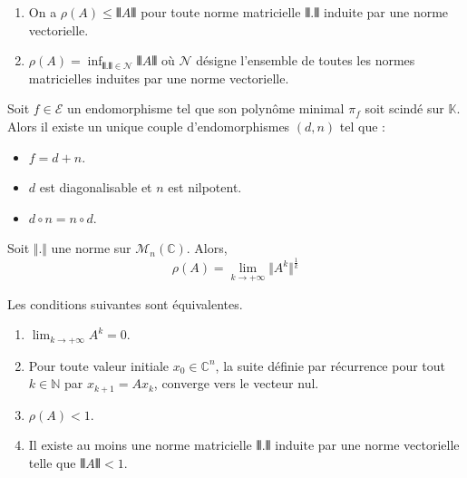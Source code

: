   \begin{theorem}
    \begin{enumerate}[label=(\roman*)]
      \item On a $\rho(A) \leq \VERT A \VERT$ pour toute norme matricielle $\VERT . \VERT$ induite par une norme vectorielle.
      \item $\rho(A) = \inf_{\VERT . \VERT \in \mathcal{N}} \VERT A \VERT$ où $\mathcal{N}$ désigne l'ensemble de toutes les normes matricielles induites par une norme vectorielle.
    \end{enumerate}
  \end{theorem}


  \begin{theorem}
    Soit $f \in \mathcal{E}$ un endomorphisme tel que son polynôme minimal $\pi_f$ soit scindé sur $\mathbb{K}$. Alors il existe un unique couple d'endomorphismes $(d, n)$ tel que :
    \begin{itemize}
      \item $f = d + n$.
      \item $d$ est diagonalisable et $n$ est nilpotent.
      \item $d \circ n = n \circ d$.
    \end{itemize}
  \end{theorem}


  \begin{corollary}
    Soit $\Vert . \Vert$ une norme sur $\mathcal{M}_n(\mathbb{C})$. Alors,
    \[ \rho(A) = \lim_{k \rightarrow +\infty} \Vert A^k \Vert^{\frac{1}{k}} \]
  \end{corollary}

  \begin{proposition}
    Les conditions suivantes sont équivalentes.
    \begin{enumerate}[label=(\roman*)]
      \item $\lim_{k \rightarrow +\infty} A^k = 0$.
      \item Pour toute valeur initiale $x_0 \in \mathbb{C}^n$, la suite définie par récurrence pour tout $k \in \mathbb{N}$ par $x_{k+1} = A x_k$, converge vers le vecteur nul.
      \item $\rho(A) < 1$.
      \item Il existe au moins une norme matricielle $\VERT . \VERT$ induite par une norme vectorielle telle que $\VERT A \VERT < 1$.
    \end{enumerate}
  \end{proposition}

